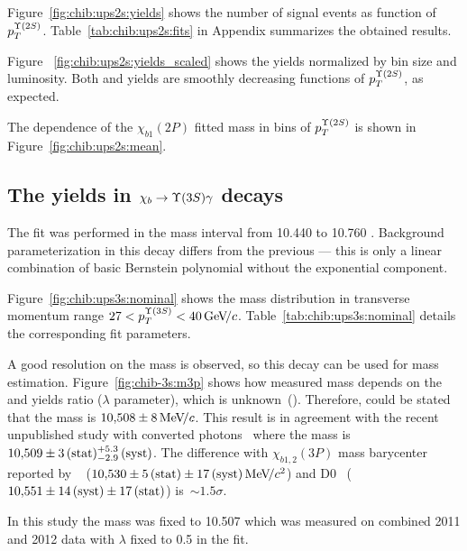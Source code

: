 

Figure~\ref{fig:chib:ups2s:yields} shows the number of signal events as function
of $p_T^{\Y2S}$. Table~\ref{tab:chib:ups2s:fits} in Appendix summarizes the
obtained results.



Figure ~\ref{fig:chib:ups2s:yields_scaled} shows the yields normalized by bin
size and luminosity. Both \chibTwoP and \chibThreeP yields are smoothly
decreasing functions of $p_T^{\Y2S}$, as expected.

The dependence of the $\chi_{b1}(2P)$ fitted mass in bins of $p_T^{\Y2S}$ is
shown in Figure~\ref{fig:chib:ups2s:mean}.


\subsection{The \texorpdfstring{\chib}{chib} yields in
	\texorpdfstring{$\chib \to \Y3S \gamma$}{chib --> Y(3S) gamma} decays}
\label{sec:chib:ups3s:fit}

The fit was performed in the mass interval from  10.440 to 10.760 \gevcc. 
Background parameterization in this decay differs from the previous ---
this is only a linear combination of basic Bernstein polynomial without the
exponential component.

Figure~\ref{fig:chib:ups3s:nominal} shows the mass distribution in transverse
momentum range $27<p_T^{\Y3S}<40\gevc$. Table~\ref{tab:chib:ups3s:nominal}
details the corresponding fit parameters.




A good resolution on the \chiboneThreeP mass is observed, so this decay can be
used for \chiboneThreeP mass estimation. Figure~\ref{fig:chib-3s:m3p} shows how
\chiboneThreeP measured mass depends on the \chiboneThreeP and \chibtwoThreeP
yields ratio ($\lambda$ parameter), which is unknown~(). 
Therefore, could be stated that the \chiboneThreeP mass is $10{,}508 \pm 8{\mathrm{\,Me\kern -0.1em V\!/}c}$.
This result is in agreement with the recent unpublished 
\lhcb study with converted photons~\cite{xxx} where the \chiboneThreeP mass is
$10{,}509 \pm 3\mathrm{\,(stat)}{}^{+5.3}_{-2.9}\mathrm{\,(syst)}$. The difference with
$\chi_{b1,2}(3P)$ mass barycenter reported by \atlas~\cite{Aad:2011ih} ($10{,}530 \pm 5\mathrm{\,(stat)}
\pm 17\mathrm{\,(syst)} {\mathrm{\,Me\kern -0.1em V\!/}c^2}$) and D0~\cite{Abazov:2012gh}  ($10{,}551 \pm 14\mathrm{\,(syst)} \pm 17\mathrm{\,(stat)}$)
is~$\sim{}1.5\sigma$.




In this study the mass was fixed to 10.507 \gevcc which was measured 
on combined 2011 and 2012 data with $\lambda$ fixed to 0.5 in the fit.





